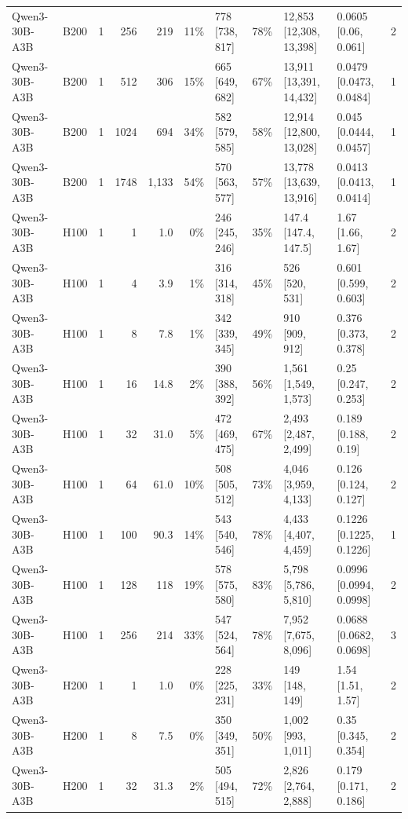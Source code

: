 \begin{landscape}
\begin{longtable}{llrrrrlrllr}
Qwen3-30B-A3B & B200 & 1 & 256 & 219 & 11\% & 778 {[}738, 817{]} & 78\% & 12,853 {[}12,308, 13,398{]} & 0.0605 {[}0.06, 0.061{]} & 2 \\
Qwen3-30B-A3B & B200 & 1 & 512 & 306 & 15\% & 665 {[}649, 682{]} & 67\% & 13,911 {[}13,391, 14,432{]} & 0.0479 {[}0.0473, 0.0484{]} & 1 \\
Qwen3-30B-A3B & B200 & 1 & 1024 & 694 & 34\% & 582 {[}579, 585{]} & 58\% & 12,914 {[}12,800, 13,028{]} & 0.045 {[}0.0444, 0.0457{]} & 1 \\
Qwen3-30B-A3B & B200 & 1 & 1748 & 1,133 & 54\% & 570 {[}563, 577{]} & 57\% & 13,778 {[}13,639, 13,916{]} & 0.0413 {[}0.0413, 0.0414{]} & 1 \\
Qwen3-30B-A3B & H100 & 1 & 1 & 1.0 & 0\% & 246 {[}245, 246{]} & 35\% & 147.4 {[}147.4, 147.5{]} & 1.67 {[}1.66, 1.67{]} & 2 \\
Qwen3-30B-A3B & H100 & 1 & 4 & 3.9 & 1\% & 316 {[}314, 318{]} & 45\% & 526 {[}520, 531{]} & 0.601 {[}0.599, 0.603{]} & 2 \\
Qwen3-30B-A3B & H100 & 1 & 8 & 7.8 & 1\% & 342 {[}339, 345{]} & 49\% & 910 {[}909, 912{]} & 0.376 {[}0.373, 0.378{]} & 2 \\
Qwen3-30B-A3B & H100 & 1 & 16 & 14.8 & 2\% & 390 {[}388, 392{]} & 56\% & 1,561 {[}1,549, 1,573{]} & 0.25 {[}0.247, 0.253{]} & 2 \\
Qwen3-30B-A3B & H100 & 1 & 32 & 31.0 & 5\% & 472 {[}469, 475{]} & 67\% & 2,493 {[}2,487, 2,499{]} & 0.189 {[}0.188, 0.19{]} & 2 \\
Qwen3-30B-A3B & H100 & 1 & 64 & 61.0 & 10\% & 508 {[}505, 512{]} & 73\% & 4,046 {[}3,959, 4,133{]} & 0.126 {[}0.124, 0.127{]} & 2 \\
Qwen3-30B-A3B & H100 & 1 & 100 & 90.3 & 14\% & 543 {[}540, 546{]} & 78\% & 4,433 {[}4,407, 4,459{]} & 0.1226 {[}0.1225, 0.1226{]} & 1 \\
Qwen3-30B-A3B & H100 & 1 & 128 & 118 & 19\% & 578 {[}575, 580{]} & 83\% & 5,798 {[}5,786, 5,810{]} & 0.0996 {[}0.0994, 0.0998{]} & 2 \\
Qwen3-30B-A3B & H100 & 1 & 256 & 214 & 33\% & 547 {[}524, 564{]} & 78\% & 7,952 {[}7,675, 8,096{]} & 0.0688 {[}0.0682, 0.0698{]} & 3 \\
Qwen3-30B-A3B & H200 & 1 & 1 & 1.0 & 0\% & 228 {[}225, 231{]} & 33\% & 149 {[}148, 149{]} & 1.54 {[}1.51, 1.57{]} & 2 \\
Qwen3-30B-A3B & H200 & 1 & 8 & 7.5 & 0\% & 350 {[}349, 351{]} & 50\% & 1,002 {[}993, 1,011{]} & 0.35 {[}0.345, 0.354{]} & 2 \\
Qwen3-30B-A3B & H200 & 1 & 32 & 31.3 & 2\% & 505 {[}494, 515{]} & 72\% & 2,826 {[}2,764, 2,888{]} & 0.179 {[}0.171, 0.186{]} & 2 \\

\end{longtable}
\end{landscape}
